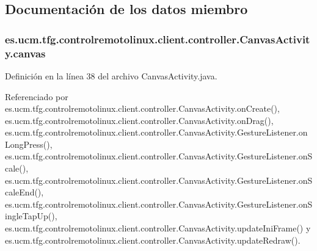 \subsection{Documentación de los datos miembro}
\hypertarget{classes_1_1ucm_1_1tfg_1_1controlremotolinux_1_1client_1_1controller_1_1CanvasActivity_a6b6d291cfbc0e886364a1c300d034397}{
\subsubsection[{canvas}]{ es.\-ucm.\-tfg.\-controlremotolinux.\-client.\-controller.\-Canvas\-Activity.\-canvas\hspace{0.3cm}{\ttfamily [private]}}}\label{classes_1_1ucm_1_1tfg_1_1controlremotolinux_1_1client_1_1controller_1_1CanvasActivity_a6b6d291cfbc0e886364a1c300d034397}


Definición en la línea 38 del archivo Canvas\-Activity.\-java.



Referenciado por es.\-ucm.\-tfg.\-controlremotolinux.\-client.\-controller.\-Canvas\-Activity.\-on\-Create(), es.\-ucm.\-tfg.\-controlremotolinux.\-client.\-controller.\-Canvas\-Activity.\-on\-Drag(), es.\-ucm.\-tfg.\-controlremotolinux.\-client.\-controller.\-Canvas\-Activity.\-Gesture\-Listener.\-on\-Long\-Press(), es.\-ucm.\-tfg.\-controlremotolinux.\-client.\-controller.\-Canvas\-Activity.\-Gesture\-Listener.\-on\-Scale(), es.\-ucm.\-tfg.\-controlremotolinux.\-client.\-controller.\-Canvas\-Activity.\-Gesture\-Listener.\-on\-Scale\-End(), es.\-ucm.\-tfg.\-controlremotolinux.\-client.\-controller.\-Canvas\-Activity.\-Gesture\-Listener.\-on\-Single\-Tap\-Up(), es.\-ucm.\-tfg.\-controlremotolinux.\-client.\-controller.\-Canvas\-Activity.\-update\-Ini\-Frame() y es.\-ucm.\-tfg.\-controlremotolinux.\-client.\-controller.\-Canvas\-Activity.\-update\-Redraw().

